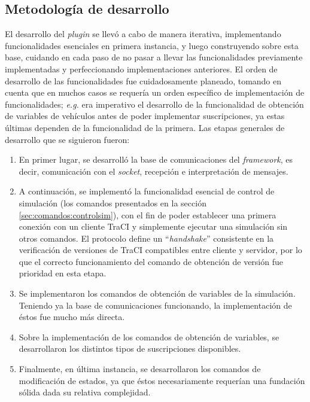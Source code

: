 \subsection{Metodología de desarrollo} \label{sec:metodologia}

El desarrollo del \emph{plugin} se llevó a cabo de manera iterativa, implementando funcionalidades esenciales en primera instancia, y luego construyendo sobre esta base, cuidando en cada paso de no pasar a llevar las funcionalidades previamente implementadas y perfeccionando implementaciones anteriores. El orden de desarrollo de las funcionalidades fue cuidadosamente planeado, tomando en cuenta que en muchos casos se requería un orden específico de implementación de funcionalidades; \emph{e.g.} era imperativo el desarrollo de la funcionalidad de obtención de variables de vehículos antes de poder implementar suscripciones, ya estas últimas dependen de la funcionalidad de la primera. Las etapas generales de desarrollo que se siguieron fueron:

\begin{enumerate}
    \item En primer lugar, se desarrolló la base de comunicaciones del \emph{framework}, es decir, comunicación con el \emph{socket}, recepción e interpretación de mensajes. 
    
    \item A continuación, se implementó la funcionalidad esencial de control de simulación (los comandos presentados en la sección \ref{sec:comandos:controlsim}), con el fin de poder establecer una primera conexión con un cliente TraCI y simplemente ejecutar una simulación sin otros comandos. 
    El protocolo define un ``\emph{handshake}'' consistente en la verificación de versiones de TraCI compatibles entre cliente y servidor, por lo que el correcto funcionamiento del comando de obtención de versión fue prioridad en esta etapa.
    
    \item Se implementaron los comandos de obtención de variables de la simulación. Teniendo ya la base de comunicaciones funcionando, la implementación de éstos fue mucho más directa.
    
    \item Sobre la implementación de los comandos de obtención de variables, se desarrollaron los distintos tipos de suscripciones disponibles.
    
    \item Finalmente, en última instancia, se desarrollaron los comandos de modificación de estados, ya que éstos necesariamente requerían una fundación sólida dada su relativa complejidad.
\end{enumerate}

